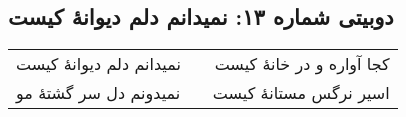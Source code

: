 \begin{center}
\section*{دوبیتی شماره ۱۳: نمیدانم دلم دیوانهٔ کیست}
\label{sec:013}
\begin{longtable}{l p{0.5cm} r}
نمیدانم دلم دیوانهٔ کیست
&&
کجا آواره و در خانهٔ کیست
\\
نمیدونم دل سر گشتهٔ مو
&&
اسیر نرگس مستانهٔ کیست
\\
\end{longtable}
\end{center}
